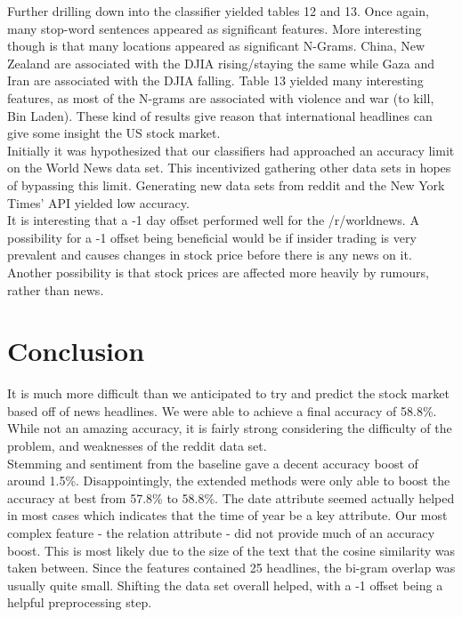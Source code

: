 \documentclass[11pt,a4paper]{article}
\begin{document}
Further drilling down into the classifier yielded tables 12 and 13. Once again, many stop-word sentences appeared as significant features. More interesting though is that many locations appeared as significant N-Grams. China, New Zealand are associated with the DJIA rising/staying the same while Gaza and Iran are associated with the DJIA falling. Table 13 yielded many interesting features, as most of the N-grams are associated with violence and war (to kill, Bin Laden). These kind of results give reason that international headlines can give some insight the US stock market.\\

Initially it was hypothesized that our classifiers had approached an accuracy limit on the World News data set. This incentivized gathering other data sets in hopes of bypassing this limit. Generating new data sets from reddit and the New York Times' API yielded low accuracy.\\

It is interesting that a -1 day offset performed well for the /r/worldnews. A possibility for a -1 offset being beneficial would be if insider trading is very prevalent and causes changes in stock price before there is any news on it. Another possibility is that stock prices are affected more heavily by rumours, rather than news.\\

\section{Conclusion}
It is much more difficult than we anticipated to try and predict the stock market based off of news headlines. We were able to achieve a final accuracy of 58.8\%. While not an amazing accuracy, it is fairly strong considering the difficulty of the problem, and weaknesses of the reddit data set.\\

Stemming and sentiment from the baseline gave a decent accuracy boost of around 1.5\%. Disappointingly, the extended methods were only able to boost the accuracy at best from 57.8\% to 58.8\%. The date attribute seemed actually helped in most cases which indicates that the time of year be a key attribute. Our most complex feature - the relation attribute - did not provide much of an accuracy boost. This is most likely due to the size of the text that the cosine similarity was taken between. Since the features contained 25 headlines, the bi-gram overlap was usually quite small. Shifting the data set overall helped, with a -1 offset being a helpful preprocessing step. \\
\end{document}
